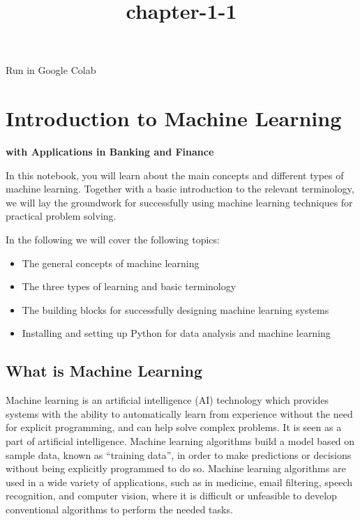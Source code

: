 \documentclass[11pt]{article}
\title{chapter-1-1}
\providecommand{\tightlist}{%
      \setlength{\itemsep}{0pt}\setlength{\parskip}{0pt}}
\begin{document}
    
    \maketitle
    
    

    
    Run in Google Colab

    \hypertarget{introduction-to-machine-learning}{%
\section{Introduction to Machine
Learning}\label{introduction-to-machine-learning}}

\textbf{with Applications in Banking and Finance}

    In this notebook, you will learn about the main concepts and different
types of machine learning. Together with a basic introduction to the
relevant terminology, we will lay the groundwork for successfully using
machine learning techniques for practical problem solving.

In the following we will cover the following topics:

\begin{itemize}
\tightlist
\item
  The general concepts of machine learning
\item
  The three types of learning and basic terminology
\item
  The building blocks for successfully designing machine learning
  systems
\item
  Installing and setting up Python for data analysis and machine
  learning
\end{itemize}

    \hypertarget{what-is-machine-learning}{%
\subsection{What is Machine Learning}\label{what-is-machine-learning}}

Machine learning is an artificial intelligence (AI) technology which
provides systems with the ability to automatically learn from experience
without the need for explicit programming, and can help solve complex
problems. It is seen as a part of artificial intelligence. Machine
learning algorithms build a model based on sample data, known as
``training data'', in order to make predictions or decisions without
being explicitly programmed to do so. Machine learning algorithms are
used in a wide variety of applications, such as in medicine, email
filtering, speech recognition, and computer vision, where it is
difficult or unfeasible to develop conventional algorithms to perform
the needed tasks.
\end{document}
